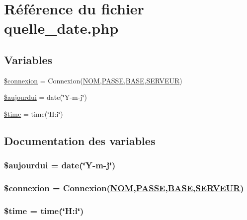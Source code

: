 \hypertarget{tr__cus_2quelle__date_8php}{
\section{R\'{e}f\'{e}rence du fichier quelle\_\-date.php}
\label{tr__cus_2quelle__date_8php}
}
\subsection*{Variables}
\begin{CompactItemize}
\item 
\hyperlink{tr__cus_2quelle__date_8php_a0}{\$connexion} = Connexion(\hyperlink{pma__connect_8php_a0}{NOM},\hyperlink{pma__connect_8php_a1}{PASSE},\hyperlink{pma__connect_8php_a3}{BASE},\hyperlink{pma__connect_8php_a2}{SERVEUR})
\item 
\hyperlink{tr__cus_2quelle__date_8php_a1}{\$aujourdui} = date(\char`\"{}Y-m-j\char`\"{})
\item 
\hyperlink{tr__cus_2quelle__date_8php_a2}{\$time} = time(\char`\"{}H:i\char`\"{})
\end{CompactItemize}


\subsection{Documentation des variables}
\hypertarget{tr__cus_2quelle__date_8php_a1}{
\subsubsection[\$aujourdui]{\setlength{\rightskip}{0pt plus 5cm}\$aujourdui = date(\char`\"{}Y-m-j\char`\"{})}}
\label{tr__cus_2quelle__date_8php_a1}


\hypertarget{tr__cus_2quelle__date_8php_a0}{
\subsubsection[\$connexion]{\setlength{\rightskip}{0pt plus 5cm}\$connexion = Connexion(\hyperlink{pma__connect_8php_a0}{NOM},\hyperlink{pma__connect_8php_a1}{PASSE},\hyperlink{pma__connect_8php_a3}{BASE},\hyperlink{pma__connect_8php_a2}{SERVEUR})}}
\label{tr__cus_2quelle__date_8php_a0}


\hypertarget{tr__cus_2quelle__date_8php_a2}{
\subsubsection[\$time]{\setlength{\rightskip}{0pt plus 5cm}\$time = time(\char`\"{}H:i\char`\"{})}}
\label{tr__cus_2quelle__date_8php_a2}


